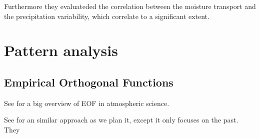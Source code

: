 Furthermore they evaluateded the correlation between the moisture transport and the precipitation variability, which correlate to a significant extent.

\section{Pattern analysis}

\subsection{Empirical Orthogonal Functions}

See \cite{hannachi_empirical_2007} for a big overview of EOF in atmospheric science.

See \cite{ayantobo_integrated_2022} for an similar approach as we plan it, except it only focuses on the past.
They 
